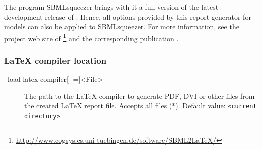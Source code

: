 The program SBMLsqueezer brings with it a full version of the latest development
release of \SBMLLaTeX. Hence, all options provided by this report generator for
\SBML models can also be applied to SBMLsqueezer. For more information, see
the project web site of
\SBMLLaTeX\footnote{\url{http://www.cogsys.cs.uni-tuebingen.de/software/SBML2LaTeX/}}
and the corresponding publication \citep{Draeger2009b}.

\subsubsection{\LaTeX{} compiler location}
\begin{description}
\item[--load-latex-compiler{[} |={]}<File>]
  The path to the \LaTeX{} compiler to generate PDF, DVI or other
  files from the created \LaTeX{} report file. Accepts all files
  (*).
  Default value: \texttt{<current directory>}
\end{description}

